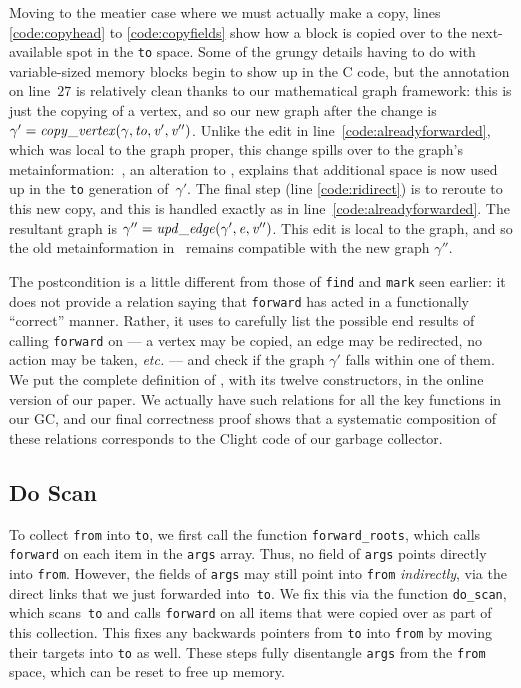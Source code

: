 \documentclass[acmsmall,screen]{acmart}
\newcommand{\li}[1]{{\texttt{\small #1}}}
\begin{document}
Moving to the meatier case where we must actually make a copy,
lines \ref{code:copyhead} to \ref{code:copyfields} show
how a block is copied over to the next-available spot in the
\li{to} space. Some of the grungy details having to do with
variable-sized memory blocks begin to show up in the C code,
but the annotation on line~$27$ is relatively clean
thanks to our mathematical graph framework:
this is just the copying of a vertex, and so our new graph after the change is
$\gamma' = \mathit{copy\_vertex}(\gamma, \mathit{to}, \mathit{v'}, \mathit{v''})$.
Unlike the edit in line~\ref{code:alreadyforwarded}, which was
local to the graph proper, this
change spills over to the graph's metainformation:~, 
an alteration to , explains that additional 
space is now used up in the \li{to} generation of~$\gamma'$. 
The final step (line \ref{code:ridirect}) is to reroute to this
new copy, and this is handled exactly as in line~\ref{code:alreadyforwarded}. 
The resultant graph is $\gamma'' = \mathit{upd\_edge}(\gamma', \mathit{e}, \mathit{v''})$. 
This edit is local to the graph, and so the old metainformation in~ 
remains compatible with the new graph $\gamma''$.

The postcondition is a little different from those of \li{find}
and \li{mark} seen earlier: it does not provide a relation
saying that \li{forward} has acted in a functionally ``correct'' manner. 
Rather, it uses  to carefully list the possible 
end results of calling
\li{forward} on  --- a vertex may be copied, an edge may be redirected, 
no action may be taken, \emph{etc.} --- and check if the graph
$\gamma'$ falls within one of them.
We put the complete definition
of , with its twelve constructors, 
in the online version of our paper.
We actually have such relations for all the key functions in our GC, 
and our final correctness proof shows that a 
systematic composition of these relations corresponds to the 
Clight code of our garbage collector. 


\subsection{Do Scan}
\label{sec:gcdoscan}

To collect \li{from} into \li{to}, 
we first call the function \li{forward\_roots}, which calls \li{forward} 
on each item in the \li{args} array. 
Thus, no field of \li{args} points directly into \li{from}. 
However, the fields of \li{args} may still point into \li{from} \emph{indirectly}, 
via the direct links that we just forwarded into~\li{to}.
We fix this via the function 
\li{do\_scan}, which scans~\li{to} and calls 
\li{forward} on all items that were copied over as part of this collection.
This fixes any backwards pointers from \li{to} into \li{from} by moving
their targets into \li{to} as well.
These steps fully disentangle \li{args} from the 
\li{from} space, which can be reset to free up memory. 
\end{document}
